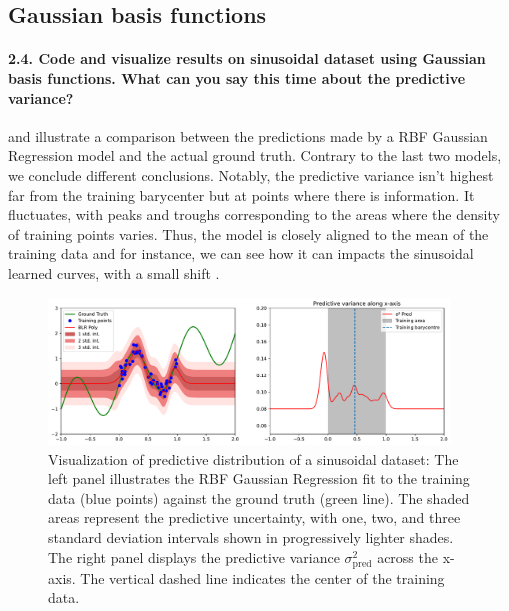 \subsection{Gaussian basis functions}

\paragraph*{2.4. Code and visualize results on sinusoidal dataset using Gaussian basis functions. What can you say this time about the predictive variance?}

 and  illustrate a comparison between the predictions made by a RBF Gaussian Regression model and the actual ground truth. Contrary to the last two models, we conclude different conclusions. Notably, the predictive variance isn't highest far from the training barycenter but at points where there is information. It fluctuates, with peaks and troughs corresponding to the areas where the density of training points varies. Thus, the model is closely aligned to the mean of the training data and for instance, we can see how it can impacts the sinusoidal learned curves, with a small shift .


\begin{figure}[H]
    \centering
    \includegraphics[width=0.95\textwidth]{phi_gaussian.pdf}
    \caption{Visualization of predictive distribution of a sinusoidal dataset: The left panel illustrates the RBF Gaussian Regression fit to the training data (blue points) against the ground truth (green line). The shaded areas represent the predictive uncertainty, with one, two, and three standard deviation intervals shown in progressively lighter shades. The right panel displays the predictive variance $\sigma^2_{\text{pred}}$ across the x-axis. The vertical dashed line indicates the center of the training data.}
    \label{fig:phi_gaussian}
\end{figure}

